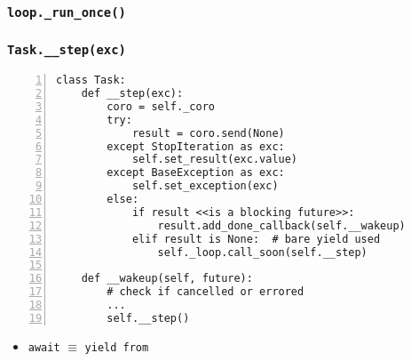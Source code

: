 \documentclass[compress,usenames,dvipsnames]{beamer}
\begin{document}
\begin{frame}[plain]
    \frametitle{\lstinline{loop._run_once()}}
    \begin{algorithm}[H]
        \SetAlgoNoEnd
        \DontPrintSemicolon
    \end{algorithm}
\end{frame}

\begin{frame}
    \frametitle{\lstinline{Task.__step(exc)}}
    \scriptsize
    \begin{lstlisting}[numbers=left]
class Task:
    def __step(exc):
        coro = self._coro
        try:
            result = coro.send(None)
        except StopIteration as exc:
            self.set_result(exc.value)
        except BaseException as exc:
            self.set_exception(exc)
        else:
            if result <<is a blocking future>>:
                result.add_done_callback(self.__wakeup)
            elif result is None:  # bare yield used
                self._loop.call_soon(self.__step)

    def __wakeup(self, future):
        # check if cancelled or errored
        ...
        self.__step()
    \end{lstlisting}

\begin{itemize}
    \item {\lstinline{await}} $\equiv$ {\lstinline{yield from}}
\end{itemize}
\end{frame}
\end{document}
